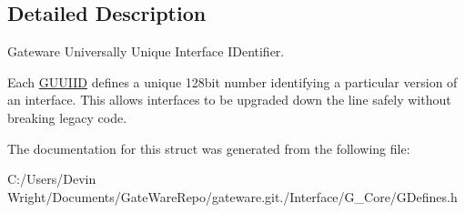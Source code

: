 \subsection{Detailed Description}
Gateware Universally Unique Interface I\+Dentifier. 

Each \mbox{\hyperlink{struct_g_w_1_1_g_u_u_i_i_d}{G\+U\+U\+I\+ID}} defines a unique 128bit number identifying a particular version of an interface. This allows interfaces to be upgraded down the line safely without breaking legacy code. 

The documentation for this struct was generated from the following file\+:\begin{DoxyCompactItemize}
\item 
C\+:/\+Users/\+Devin Wright/\+Documents/\+Gate\+Ware\+Repo/gateware.\+git./\+Interface/\+G\+\_\+\+Core/G\+Defines.\+h\end{DoxyCompactItemize}

